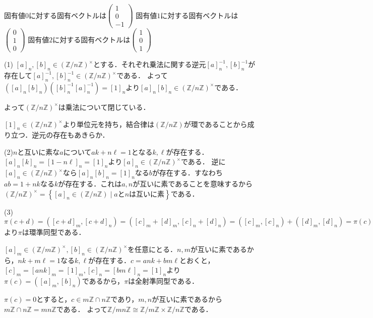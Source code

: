 \documentclass[
		book,
		head_space=20mm,
		foot_space=20mm,
		gutter=10mm,
		line_length=190mm
]{jlreq}
\begin{document}
固有値$0$に対する固有ベクトルは$\begin{pmatrix}
    1 \\
    0 \\
    -1
\end{pmatrix}$
固有値$1$に対する固有ベクトルは$\begin{pmatrix}
    0\\
    1\\
    0
\end{pmatrix}$
固有値$2$に対する固有ベクトルは$\begin{pmatrix}
    1 \\
    0 \\
    1
\end{pmatrix}$

(1) $[a]_n,[b]_n \in (\mathbb{Z}/n \mathbb{Z})^{\times}$とする．それぞれ乗法に関する逆元$[a]_n^{-1},[b]_n^{-1}$が存在して$[a]_n^{-1},[b]_n^{-1}\in(\mathbb{Z}/n \mathbb{Z})^{\times}$である．
よって$([a]_n[b]_n)([b]_n^{-1}[a]_n^{-1})=[1]_n$より$[a]_n[b]_n \in (\mathbb{Z}/n \mathbb{Z})^{\times}$である．

よって$(\mathbb{Z}/n \mathbb{Z})^{\times}$は乗法について閉じている．

$[1]_n \in (\mathbb{Z}/n \mathbb{Z})^{\times}$より単位元を持ち，結合律は$(\mathbb{Z}/n \mathbb{Z})$が環であることから成り立つ．逆元の存在もあきらか．

(2)$n$と互いに素な$a$について$ak+n\ell=1$となる$k,\ell$が存在する．$[a]_n[k]_n=[1-n\ell]_n=[1]_n$より$[a]_n \in (\mathbb{Z}/n \mathbb{Z})^{\times}$である．
逆に$[a]_n \in (\mathbb{Z}/n \mathbb{Z})^{\times}$なら$[a]_n[b]_n=[1]_n$なる$b$が存在する．すなわち$ab=1+nk$なる$k$が存在する．これは$a,n$が互いに素であることを意味するから$(\mathbb{Z}/n \mathbb{Z})^{\times}=\left\{ [a]_n \in (\mathbb{Z}/n \mathbb{Z})\mid \text{$a$と$n$は互いに素} \right\}$である．

(3)$\pi(c+d)=([c+d]_m,[c+d]_n)=([c]_m+[d]_m,[c]_n+[d]_n)=([c]_m,[c]_n)+([d]_m,[d]_n)=\pi(c)+\pi(d),\pi(cd)=([cd]_m,[cd]_n)=([c]_m[d]_m,[c]_n[d]_n)=([c]_m,[c]_n)([d]_m,[d]_n)=\pi(c)\pi(d),\pi(1)=([1]_m,[1]_n)$より$\pi$は環準同型である．

$[a]_m \in (\mathbb{Z}/m \mathbb{Z})^{\times},[b]_n \in (\mathbb{Z}/n \mathbb{Z})^{\times}$を任意にとる．$n,m$が互いに素であるから，$nk+m\ell=1$なる$k,\ell$が存在する．$c=ank+bm\ell$とおくと，$[c]_m=[ank]_m=[1]_m,[c]_n=[bm\ell]_n=[1]_n$より$\pi(c)=([a]_m,[b]_n)$であるから，$\pi$は全射準同型である．

$\pi(c)=0$とすると，$c \in m \mathbb{Z} \cap n \mathbb{Z}$であり，$m,n$が互いに素であるから$m \mathbb{Z} \cap n \mathbb{Z}= mn \mathbb{Z}$である．
よって$\mathbb{Z}/mn \mathbb{Z}\cong \mathbb{Z}/m \mathbb{Z} \times \mathbb{Z}/n \mathbb{Z}$である．
\end{document}
